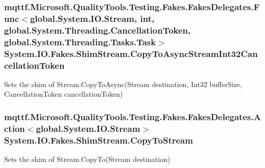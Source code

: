 \hypertarget{class_system_1_1_i_o_1_1_fakes_1_1_shim_stream_a3df7540f23f5050167e964f0678028ab}{
\subsubsection[{Copy\-To\-Async\-Stream\-Int32\-Cancellation\-Token}]{\setlength{\rightskip}{0pt plus 5cm}mqttf.\-Microsoft.\-Quality\-Tools.\-Testing.\-Fakes.\-Fakes\-Delegates.\-Func$<$global.\-System.\-I\-O.\-Stream, int, global.\-System.\-Threading.\-Cancellation\-Token, global.\-System.\-Threading.\-Tasks.\-Task$>$ System.\-I\-O.\-Fakes.\-Shim\-Stream.\-Copy\-To\-Async\-Stream\-Int32\-Cancellation\-Token\hspace{0.3cm}{\ttfamily [set]}}}\label{class_system_1_1_i_o_1_1_fakes_1_1_shim_stream_a3df7540f23f5050167e964f0678028ab}


Sets the shim of Stream.\-Copy\-To\-Async(\-Stream destination, Int32 buffer\-Size, Cancellation\-Token cancellation\-Token)

\hypertarget{class_system_1_1_i_o_1_1_fakes_1_1_shim_stream_af9feb0782e81e1e5543df1092a8c0493}{
\subsubsection[{Copy\-To\-Stream}]{\setlength{\rightskip}{0pt plus 5cm}mqttf.\-Microsoft.\-Quality\-Tools.\-Testing.\-Fakes.\-Fakes\-Delegates.\-Action$<$global.\-System.\-I\-O.\-Stream$>$ System.\-I\-O.\-Fakes.\-Shim\-Stream.\-Copy\-To\-Stream\hspace{0.3cm}{\ttfamily [set]}}}\label{class_system_1_1_i_o_1_1_fakes_1_1_shim_stream_af9feb0782e81e1e5543df1092a8c0493}


Sets the shim of Stream.\-Copy\-To(\-Stream destination)


